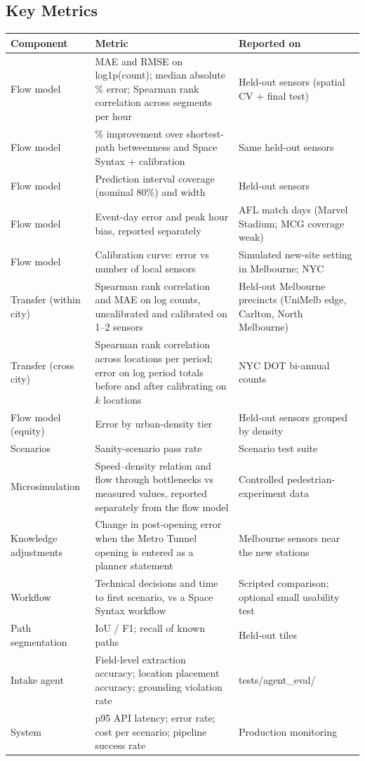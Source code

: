 \documentclass[11pt]{article}
\newcommand{\hrow}{\rowcolor{headgray}}
\begin{document}
\subsection{Key Metrics}

\begin{xltabular}{\linewidth}{|L{3.0cm}|Y|L{4.2cm}|}
\hline\hrow
\textbf{Component} & \textbf{Metric} & \textbf{Reported on} \\\hline
\endhead
Flow model & MAE and RMSE on log1p(count); median absolute \% error; Spearman rank correlation across segments per hour & Held-out sensors (spatial CV + final test) \\\hline
Flow model & \% improvement over shortest-path betweenness and Space Syntax + calibration & Same held-out sensors \\\hline
Flow model & Prediction interval coverage (nominal 80\%) and width & Held-out sensors \\\hline
Flow model & Event-day error and peak hour bias, reported separately & AFL match days (Marvel Stadium; MCG coverage weak) \\\hline
Flow model & Calibration curve: error vs number of local sensors & Simulated new-site setting in Melbourne; NYC \\\hline
Transfer (within city) & Spearman rank correlation and MAE on log counts, uncalibrated and calibrated on 1--2 sensors & Held-out Melbourne precincts (UniMelb edge, Carlton, North Melbourne) \\\hline
Transfer (cross city) & Spearman rank correlation across locations per period; error on log period totals before and after calibrating on $k$ locations & NYC DOT bi-annual counts \\\hline
Flow model (equity) & Error by urban-density tier & Held-out sensors grouped by density \\\hline
Scenarios & Sanity-scenario pass rate & Scenario test suite \\\hline
Microsimulation & Speed--density relation and flow through bottlenecks vs measured values, reported separately from the flow model & Controlled pedestrian-experiment data \\\hline
Knowledge adjustments & Change in post-opening error when the Metro Tunnel opening is entered as a planner statement & Melbourne sensors near the new stations \\\hline
Workflow & Technical decisions and time to first scenario, vs a Space Syntax workflow & Scripted comparison; optional small usability test \\\hline
Path segmentation & IoU / F1; recall of known paths & Held-out tiles \\\hline
Intake agent & Field-level extraction accuracy; location placement accuracy; grounding violation rate & tests/agent\_eval/ \\\hline
System & p95 API latency; error rate; cost per scenario; pipeline success rate & Production monitoring \\\hline
\end{xltabular}
\end{document}
